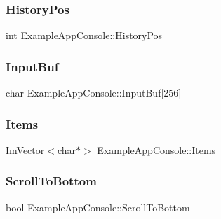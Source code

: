 \hypertarget{struct_example_app_console_a2508db0a7d205947cea65b141d4ed589}{}\label{struct_example_app_console_a2508db0a7d205947cea65b141d4ed589} 
\subsubsection{\texorpdfstring{History\+Pos}{HistoryPos}}
{\footnotesize\ttfamily int Example\+App\+Console\+::\+History\+Pos}

\hypertarget{struct_example_app_console_ab30accde81ae6833bd2ecf35f43f01ab}{}\label{struct_example_app_console_ab30accde81ae6833bd2ecf35f43f01ab} 
\subsubsection{\texorpdfstring{Input\+Buf}{InputBuf}}
{\footnotesize\ttfamily char Example\+App\+Console\+::\+Input\+Buf\mbox{[}256\mbox{]}}

\hypertarget{struct_example_app_console_acfde7d45fb733ac72d5d500168557b36}{}\label{struct_example_app_console_acfde7d45fb733ac72d5d500168557b36} 
\subsubsection{\texorpdfstring{Items}{Items}}
{\footnotesize\ttfamily \hyperlink{class_im_vector}{Im\+Vector}$<$char$\ast$$>$ Example\+App\+Console\+::\+Items}

\hypertarget{struct_example_app_console_a69b1406795fd71a3757761b0767ea1c5}{}\label{struct_example_app_console_a69b1406795fd71a3757761b0767ea1c5} 
\subsubsection{\texorpdfstring{Scroll\+To\+Bottom}{ScrollToBottom}}
{\footnotesize\ttfamily bool Example\+App\+Console\+::\+Scroll\+To\+Bottom}

